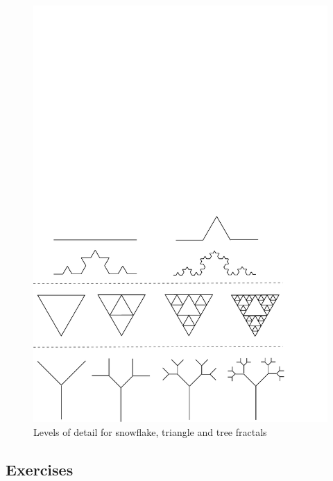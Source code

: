 \documentclass[12pt,a4paper,twoside]{article}
\renewcommand{\_}{\texttt{\symbol{95}}}
\begin{document}
\begin{figure}[t]
\centering
\includegraphics[scale=0.5,trim=10mm 10mm 10mm 155mm]{diagrams/new_fractal}
\caption{Levels of detail for snowflake, triangle and tree fractals}
\label{fractal}
\end{figure}
\subsection{Exercises}
\end{document}
